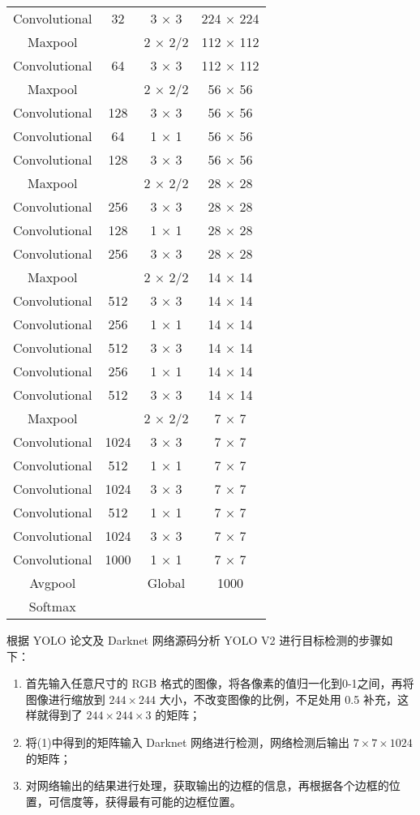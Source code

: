 {\begin{longtable}{cccc}
    Convolutional & 32   & 3 × 3   & 224 × 224 \\
    Maxpool       &      & 2 × 2/2 & 112 × 112 \\
    Convolutional & 64   & 3 × 3   & 112 × 112 \\
    Maxpool       &      & 2 × 2/2 & 56 × 56 \\
    Convolutional & 128  & 3 × 3   & 56 × 56 \\
    Convolutional & 64   & 1 × 1   & 56 × 56 \\
    Convolutional & 128  & 3 × 3   & 56 × 56 \\
    Maxpool       &      & 2 × 2/2 & 28 × 28 \\
    Convolutional & 256  & 3 × 3   & 28 × 28 \\
    Convolutional & 128  & 1 × 1   & 28 × 28 \\
    Convolutional & 256  & 3 × 3   & 28 × 28 \\
    Maxpool       &      & 2 × 2/2 & 14 × 14 \\
    Convolutional & 512  & 3 × 3   & 14 × 14 \\
    Convolutional & 256  & 1 × 1   & 14 × 14 \\
    Convolutional & 512  & 3 × 3   & 14 × 14 \\
    Convolutional & 256  & 1 × 1   & 14 × 14 \\
    Convolutional & 512  & 3 × 3   & 14 × 14 \\
    Maxpool       &      & 2 × 2/2 & 7 × 7 \\
    Convolutional & 1024 & 3 × 3   & 7 × 7 \\
    Convolutional & 512  & 1 × 1   & 7 × 7 \\
    Convolutional & 1024 & 3 × 3   & 7 × 7 \\
    Convolutional & 512  & 1 × 1   & 7 × 7 \\
    Convolutional & 1024 & 3 × 3   & 7 × 7 \\
    \midrule

    Convolutional & 1000 & 1 × 1   & 7 × 7 \\
    Avgpool       &      & Global  & 1000 \\
    Softmax       &      &         &      \\
\end{longtable}
}

根据 YOLO 论文\citep{redmon2016you,redmon2017yolo9000,redmon2018yolov3}及 Darknet 网络源码分析 YOLO V2 进行目标检测的步骤如下：

\begin{enumerate}
\item 首先输入任意尺寸的 RGB 格式的图像，将各像素的值归一化到0-1之间，再将图像进行缩放到 $244 \times 244$ 大小，不改变图像的比例，不足处用 0.5 补充，这样就得到了 $244 \times 244 \times 3$ 的矩阵；
\item 将(1)中得到的矩阵输入 Darknet 网络进行检测，网络检测后输出 $7 \times 7 \times 1024$ 的矩阵；
\item 对网络输出的结果进行处理，获取输出的边框的信息，再根据各个边框的位置，可信度等，获得最有可能的边框位置。
\end{enumerate}

